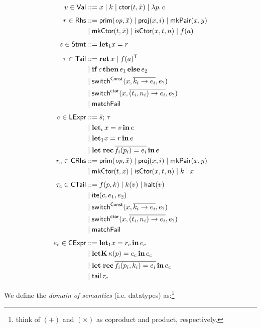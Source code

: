 \documentclass[a4paper, 11pt]{article}
\theoremstyle{remark}\newtheorem*{remark}{Remark}
\theoremstyle{definition}\newtheorem*{definition}{Definition}
\begin{document}
\begingroup\allowdisplaybreaks
\begin{align*}
v \in \mathsf{Val} &::= x \mid k \mid \mathsf{ctor}(t, \bar{x}) \mid \lambda p.\, e \\[4pt]
r \in \mathsf{Rhs} &::= \mathsf{prim}(\mathit{op}, \bar{x}) \mid \mathsf{proj}(x, i) \mid \mathsf{mkPair}(x, y) \\
&\mid \mathsf{mkCtor}(t, \bar{x}) \mid \mathsf{isCtor}(x, t, n) \mid f(a) \\[4pt]
s \in \mathsf{Stmt} &::= \mathbf{let}_1 x = r \\[4pt]
\tau \in \mathsf{Tail} &::=\mathbf{ret}\, x \mid f(a)^{\mathsf{T}}\\
&\mid \mathbf{if}\, c\, \mathbf{then}\, e_1\, \mathbf{else}\, e_2 \\
&\mid \mathsf{switch}^{\mathsf{Const}}(x, \overline{k_i \to e_i}, e_?) \\
&\mid \mathsf{switch}^{\mathsf{ctor}}(x, \overline{(t_i, n_i) \to e_i}, e_?) \\
&\mid \mathsf{matchFail} \\[4pt]
e \in \mathsf{LExpr} &::=\bar{s};\, \tau \\
&\mid \mathbf{let}_\iota\, x = v\, \mathbf{in}\, e \\
&\mid \mathbf{let}_1 x = r\, \mathbf{in}\, e \\
&\mid \mathbf{let\;rec}\, \overline{f_i(p_i) = e_i}\, \mathbf{in}\, e\\
r_c \in \mathsf{CRhs} &::=\mathsf{prim}(\mathit{op}, \bar{x}) \mid \mathsf{proj}(x, i) \mid \mathsf{mkPair}(x, y) \\
&\mid \mathsf{mkCtor}(t, \bar{x}) \mid \mathsf{isCtor}(x, t, n) \mid k \mid x \\[4pt]
\tau_c \in \mathsf{CTail} &::=f(p, k) \mid k(v) \mid \mathsf{halt}(v) \\
&\mid \mathsf{ite}(c, e_1, e_2) \\
&\mid \mathsf{switch}^{\mathsf{Const}}(x, \overline{k_i \to e_i}, e_?) \\
&\mid \mathsf{switch}^{\mathsf{ctor}}(x, \overline{(t_i, n_i) \to e_i}, e_?) \\
&\mid \mathsf{matchFail} \\[4pt]
e_c \in \mathsf{CExpr} &::=\mathbf{let}_1 x = r_c\, \mathbf{in}\, e_c \\
&\mid \mathbf{letK}\, \kappa(p) = e_c\, \mathbf{in}\, e_c \\
&\mid \mathbf{let\;rec}\, \overline{f_i(p_i, k_i) = e_i}\, \mathbf{in}\, e_c \\
&\mid \mathsf{tail}\, \tau_c
\end{align*}\endgroup

We define the \emph{domain of semantics} (i.e. datatypes) as:\footnote{
think of $(+)$ and $(\times)$ as coproduct and product, respectively.
}
\end{document}
